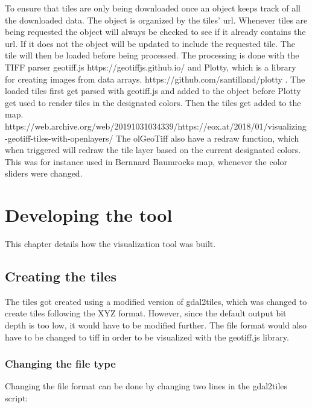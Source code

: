 To ensure that tiles are only being downloaded once an object keeps track of all the downloaded data. The object is organized by the tiles’ url. 
Whenever tiles are being requested the object will always be checked to see if it already contains the url. If it does not the object will be updated to include the requested tile. The tile will then be loaded before being processed. 
The processing is done with the TIFF parser geotiff.js 
https://geotiffjs.github.io/
and Plotty, which is a library for creating images from data arrays.
https://github.com/santilland/plotty
. The loaded tiles first get parsed with geotiff.js and added to the object before Plotty get used to render tiles in the designated colors. Then the tiles get added to the map.
\citep{BThesis}
https://web.archive.org/web/20191031034339/https://eox.at/2018/01/visualizing-geotiff-tiles-with-openlayers/
The olGeoTiff also have a redraw function, which when triggered will redraw the tile layer based on the current designated colors. This was for instance used in Bernnard Baumrocks map, whenever the color sliders were changed. 

% 

\chapter{Developing the tool}
This chapter details how the visualization tool was built.

\section{Creating the tiles}
The tiles got created using a modified version of gdal2tiles, which was changed to create tiles following the XYZ format. However, since the default output bit depth is too low, it would have to be modified further. The file format would also have to be changed to tiff in order to be visualized with the geotiff.js library. 

\subsection{Changing the file type}
Changing the file format can be done by changing two lines in the gdal2tiles script:

